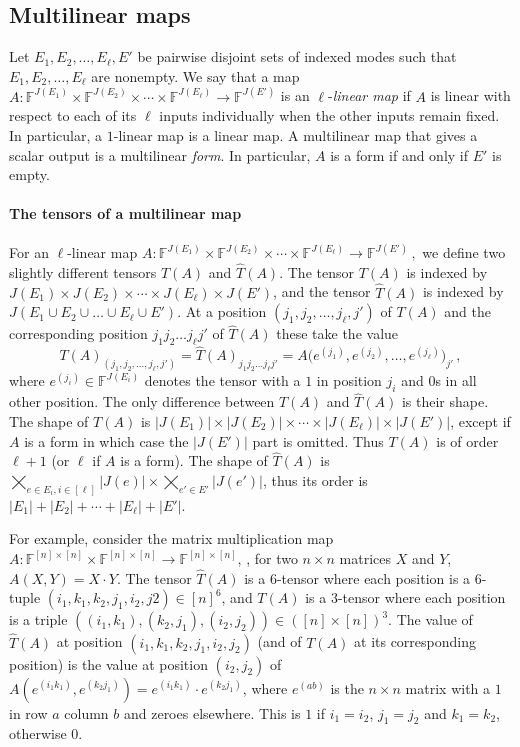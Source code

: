 \documentclass{toc}
\newcommand{\F}{\ensuremath{\mathbb{F}}}
\begin{document}
\subsection{Multilinear maps}

Let $E_1,E_2,\ldots,E_\ell,E'$ be pairwise disjoint sets of indexed modes
such that $E_1,E_2,\ldots,E_\ell$ are nonempty. We say that a map
$
A:\F^{J(E_1)}\times\F^{J(E_2)}\times\cdots \times\F^{J(E_\ell)}
      \rightarrow \F^{J(E')}
$
is an $\ell$-\emph{linear map} if
$A$ is linear with respect to each of its $\ell$ inputs
individually when the other inputs remain fixed.
In particular, a $1$-linear map is a linear map.
A multilinear map that gives a scalar output is a multilinear \emph{form}.
In particular, $A$ is a form if and only if $E'$ is empty.

\paragraph*{The tensors of a multilinear map}

For an $\ell$-linear map
$
A:\F^{J(E_1)}\times\F^{J(E_2)}\times\cdots \times\F^{J(E_\ell)}\rightarrow \F^{J(E')}\,,
$
we define two slightly different tensors $T(A)$ and $\hat{T}(A)$. The tensor $T(A)$ is indexed by $J(E_1) \times J(E_2) \times \cdots \times J(E_\ell) \times J(E')$, and the tensor $\hat{T}(A)$ is indexed by $J(E_1 \cup E_2 \cup \ldots \cup E_\ell \cup E')$.  
At a position $(j_1, j_2, \ldots, j_\ell, j')$ of $T(A)$ and the corresponding position $j_1j_2\ldots j_\ell j'$ of $\hat{T}(A)$ these take the value
\[
T(A)_{(j_1, j_2, \ldots, j_\ell,j')} = \hat{T}(A)_{j_1j_2 \ldots j_\ell j'} =
A\bigl(e^{(j_1)},e^{(j_2)},\ldots,e^{(j_\ell)}\bigr)_{j'}\,,
\]
where $e^{(j_i)} \in \F^{J(E_i)}$ denotes the tensor with a $1$ in
position $j_i$ and $0$s in all other position.
The only difference between
$T(A)$ and $\hat{T}(A)$ is their shape.  The shape of $T(A)$ is
$|J(E_1)| \times |J(E_2)| \times \cdots \times |J(E_\ell)| \times
|J(E')|$,
except if $A$ is a form in which case the $|J(E')|$ part is omitted.
Thus $T(A)$ is of order $\ell+1$ (or $\ell$ if $A$ is a form).  The
shape of $\hat{T}(A)$ is $\bigtimes_{e \in E_i, i \in [\ell]} |J(e)| \times \bigtimes_{e' \in E'} |J(e')|$, thus
its order is $|E_1| + |E_2| + \cdots + |E_\ell| + |E'|$.

For example, consider the matrix multiplication map $A: \F^{[n] \times
  [n]} \times \F^{[n] \times[n]} \rightarrow \F^{[n] \times [n]}$,
\ie, for two $n\times n$ matrices $X$ and $Y$, $A(X, Y) = X \cdot Y$.
The tensor $\hat{T}(A)$ is a $6$-tensor where each position is a
$6$-tuple $(i_1, k_1, k_2, j_1, i_2, j2) \in [n]^6$, and $T(A)$ is a
$3$-tensor where each position is a triple $((i_1, k_1), (k_2, j_1),
(i_2, j_2)) \in ([n] \times [n])^3$.
The value of $\hat{T}(A)$ at position $(i_1, k_1, k_2, j_1, i_2,
j_2)$ (and of $T(A)$ at its corresponding position) is the value at position $(i_2,j_2)$ of
$A(e^{(i_1k_1)}, e^{(k_2j_1)}) = e^{(i_1k_1)}\cdot e^{(k_2j_1)}$, where $e^{(ab)}$ is the
$n\times n$ matrix with a $1$
in row $a$ column $b$ and zeroes elsewhere.  This is $1$ if $i_1 =
i_2$, $j_1=j_2$ and $k_1=k_2$, otherwise $0$.
\end{document}
